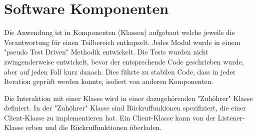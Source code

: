 \section{Software Komponenten}

Die Anwendung ist in Komponenten (Klassen) aufgebaut welche jeweils die Verantwortung für einen Teilbereich entkapselt. Jedes Modul wurde in einem "pseudo Test Driven" Methodik entwickelt. Die Tests wurden nicht zwingenderweise entwickelt, bevor der entsprechende Code geschrieben wurde, aber auf jeden Fall kurz danach. Dies führte zu stabilen Code, dass in jeder Iteration geprüft werden konnte, isoliert von anderen Komponenten.

Die Interaktion mit einer Klasse wird in einer dazugehörenden "Zuhöhrer" Klasse definiert. In der "Zuhöhrer" Klasse sind Rückruffunkionen spezifiziert, die einer Client-Klasse zu implementieren hat. Ein Client-Klasse kann von der Listener-Klasse erben und die Rückruffunktionen überladen.